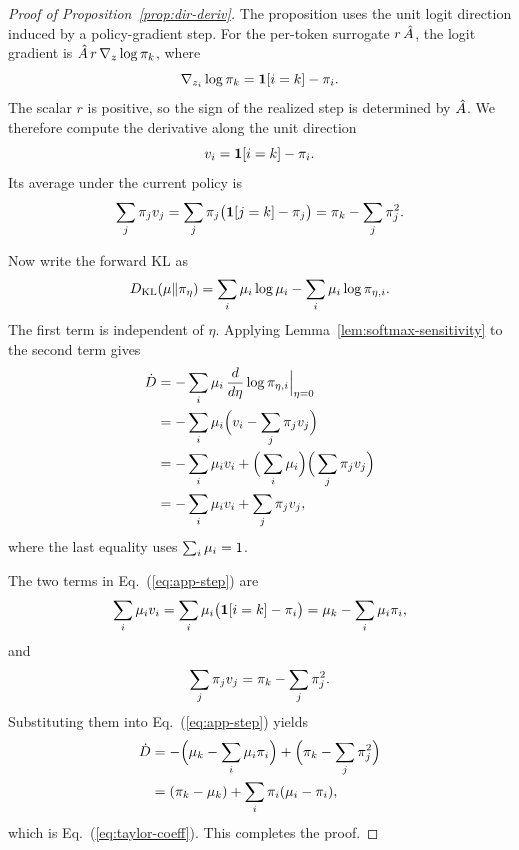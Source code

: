 \begin{proof}[Proof of Proposition~\ref{prop:dir-deriv}]
The proposition uses the unit logit direction induced by a policy-gradient step.
For the per-token surrogate $r\,\hat{A}$, the logit gradient is $\hat{A}\,r\,\nabla_z\log\pi_k$, where
\begin{equation}
\nabla_{z_i}\log\pi_k=\bm{1}[i=k]-\pi_i .
\end{equation}
The scalar $r$ is positive, so the sign of the realized step is determined by
$\hat{A}$.
We therefore compute the derivative along the unit direction
\begin{equation}
\label{eq:app-v}
v_i = \bm{1}[i=k]-\pi_i .
\end{equation}
Its average under the current policy is
\begin{equation}
\sum_j \pi_j v_j
= \sum_j \pi_j\big(\bm{1}[j=k]-\pi_j\big)
= \pi_k - \sum_j \pi_j^2 .
\end{equation}

Now write the forward KL as
\begin{equation}
D_{\mathrm{KL}}(\mu\|\pi_\eta)
=
\sum_i \mu_i\log\mu_i
-
\sum_i \mu_i\log\pi_{\eta,i} .
\end{equation}
The first term is independent of $\eta$.
Applying Lemma~\ref{lem:softmax-sensitivity} to the second term gives
\begin{align}
\dot{D}
&= -\sum_i \mu_i\,
\frac{d}{d\eta}\log\pi_{\eta,i}\Big|_{\eta=0}
\nonumber\\
&= -\sum_i \mu_i\Big(v_i-\sum_j\pi_j v_j\Big)
\nonumber\\
&= -\sum_i \mu_i v_i
+ \Big(\sum_i\mu_i\Big)\Big(\sum_j\pi_j v_j\Big)
\nonumber\\
&= -\sum_i \mu_i v_i + \sum_j\pi_j v_j,
\label{eq:app-step}
\end{align}
where the last equality uses $\sum_i\mu_i=1$.

The two terms in Eq.~(\ref{eq:app-step}) are
\begin{equation}
\sum_i \mu_i v_i
= \sum_i \mu_i\big(\bm{1}[i=k]-\pi_i\big)
= \mu_k-\sum_i\mu_i\pi_i,
\end{equation}
and
\begin{equation}
\sum_j\pi_j v_j
= \pi_k-\sum_j\pi_j^2 .
\end{equation}
Substituting them into Eq.~(\ref{eq:app-step}) yields
\begin{align}
\dot{D}
&= -\Big(\mu_k-\sum_i\mu_i\pi_i\Big)
+ \Big(\pi_k-\sum_j\pi_j^2\Big)
\nonumber\\
&= (\pi_k-\mu_k)
+ \sum_i\pi_i(\mu_i-\pi_i),
\label{eq:app-result}
\end{align}
which is Eq.~(\ref{eq:taylor-coeff}).
This completes the proof.
\end{proof}

